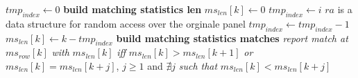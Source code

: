 \documentclass[a4paper,12pt, oneside]{book}
\begin{document}
\begin{algorithm}
\begin{algorithmic}[1]
    \EndIf
    \EndFor
    \State $tmp_{index}\gets 0$
    \Comment \textbf{build matching statistics len}
    \For {\textit{every} $k\in[0,|ms_{row}|)$}
    \State $ms_{len}[k]\gets 0$
    \Else
    \State $tmp_{index}\gets i$
    \Comment $ra$ is a data structure for random access over the orginale panel
    \State $tmp_{index}\gets tmp_{index}-1$
    \EndWhile
    \State $ms_{len}[k]\gets k-tmp_{index}$
    \EndIf
    \EndFor
    \For {\textit{every} $k\in[0,|ms_{row}|)$}
    \Comment \textbf{build matching statistics matches}
    \State \textit{report match at} $ms_{row}[k]$ \textit{with} $ms_{len}[k]$
    \textit{iff} $ms_{len}[k]> ms_{len}[k+1]$
    \State \textit{or} $ms_{len}[k]= ms_{len}[k+j]$, $j\geq 1$ and $\nexists j$
    \textit{such that}  $ms_{len}[k]< ms_{len}[k+j]$
    \EndFor
    \EndFunction
  \end{algorithmic}
  \caption{Algoritmo per match con matching-statistics (MS) e thresholds}
\end{algorithm}
\end{document}
